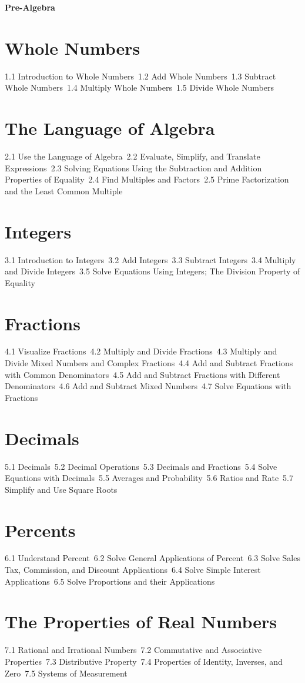 {\LARGE \bf{Pre-Algebra}}
\section{Whole Numbers}
1.1 Introduction to Whole Numbers\
1.2 Add Whole Numbers\
1.3 Subtract Whole Numbers\
1.4 Multiply Whole Numbers\
1.5 Divide Whole Numbers\
\section{The Language of Algebra}
2.1 Use the Language of Algebra\
2.2 Evaluate, Simplify, and Translate Expressions\
2.3 Solving Equations Using the Subtraction and Addition Properties of Equality\
2.4 Find Multiples and Factors\
2.5 Prime Factorization and the Least Common Multiple\
\section{Integers}
3.1 Introduction to Integers\
3.2 Add Integers\
3.3 Subtract Integers\
3.4 Multiply and Divide Integers\
3.5 Solve Equations Using Integers; The Division Property of Equality\
\section{Fractions}
4.1 Visualize Fractions\
4.2 Multiply and Divide Fractions\
4.3 Multiply and Divide Mixed Numbers and Complex Fractions\
4.4 Add and Subtract Fractions with Common Denominators\
4.5 Add and Subtract Fractions with Different Denominators\
4.6 Add and Subtract Mixed Numbers\
4.7 Solve Equations with Fractions\
\section{Decimals}
5.1 Decimals\
5.2 Decimal Operations\
5.3 Decimals and Fractions\
5.4 Solve Equations with Decimals\
5.5 Averages and Probability\
5.6 Ratios and Rate\
5.7 Simplify and Use Square Roots\
\section{Percents}
6.1 Understand Percent\
6.2 Solve General Applications of Percent\
6.3 Solve Sales Tax, Commission, and Discount Applications\
6.4 Solve Simple Interest Applications\
6.5 Solve Proportions and their Applications\
\section{The Properties of Real Numbers}
7.1 Rational and Irrational Numbers\
7.2 Commutative and Associative Properties\
7.3 Distributive Property\
7.4 Properties of Identity, Inverses, and Zero\
7.5 Systems of Measurement\
